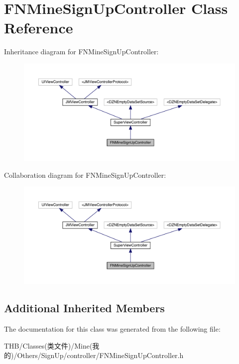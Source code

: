 \hypertarget{interface_f_n_mine_sign_up_controller}{}\section{F\+N\+Mine\+Sign\+Up\+Controller Class Reference}
\label{interface_f_n_mine_sign_up_controller}


Inheritance diagram for F\+N\+Mine\+Sign\+Up\+Controller\+:\nopagebreak
\begin{figure}[H]
\begin{center}
\leavevmode
\includegraphics[width=350pt]{interface_f_n_mine_sign_up_controller__inherit__graph}
\end{center}
\end{figure}


Collaboration diagram for F\+N\+Mine\+Sign\+Up\+Controller\+:\nopagebreak
\begin{figure}[H]
\begin{center}
\leavevmode
\includegraphics[width=350pt]{interface_f_n_mine_sign_up_controller__coll__graph}
\end{center}
\end{figure}
\subsection*{Additional Inherited Members}


The documentation for this class was generated from the following file\+:\begin{DoxyCompactItemize}
\item 
T\+H\+B/\+Classes(类文件)/\+Mine(我的)/\+Others/\+Sign\+Up/controller/F\+N\+Mine\+Sign\+Up\+Controller.\+h\end{DoxyCompactItemize}
